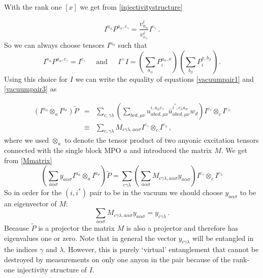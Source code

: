 \documentclass[12 pt]{article}
\begin{document}
With the rank one $[x]$ we get from \eqref{injectivitystructure}

\begin{equation}
I^{a_\alpha}P^{a_\alpha,c_\gamma} = \frac{v^i_{a_\alpha}}{v^i_{c_\gamma}}I^{c_\gamma}\, .
\end{equation}
So we can always choose tensors $I^{a_\alpha}$ such that
\begin{equation}
I^{a_\alpha}P^{a_\alpha,c_\gamma} =I^{c_\gamma}\;\;\;\;\text{ and }\;\;\;\; I^+I=\left(\sum_{a_\alpha}P_i^{a_\alpha,x}\right)\left( \sum_{b_\beta} P^{x,b_\beta}_i \right)\, .
\end{equation}
Using this choice for $I$ we can write the equality of equations \eqref{vacuumpair1} and \eqref{vacuumpair3} as

\begin{eqnarray}
\left(I^{a_\alpha}\otimes_a I^{a_\sigma} \right)\tilde{P} & =& \sum_{c,\gamma\lambda} \left( \sum_{bcd,\mu\nu} u^{i,a_\alpha c_\gamma}_{abcd,\mu\nu} \bar{u}^{i^*,c_\lambda a_\sigma}_{abcd,\mu\nu}  w_d\right) I^{c_\gamma} \otimes_c I^{c_\lambda}  \\
 & \equiv & \sum_{c,\gamma\lambda} M_{c\gamma\lambda,a\alpha\sigma} I^{c_\gamma} \otimes_c I^{c_\lambda} \, , \label{Mmatrix}
\end{eqnarray}
where we used $\otimes_a$ to denote the tensor product of two anyonic excitation tensors connected with the single block MPO $a$ and introduced the matrix $M$. We get from \eqref{Mmatrix}
\begin{equation}
\left(\sum_{a\alpha\sigma} y_{a\alpha\sigma} I^{a_\alpha}\otimes_a I^{a_\sigma} \right)\tilde{P} = \sum_{c\gamma\lambda}\left(\sum_{a\alpha\sigma} M_{c\gamma\lambda, a\alpha\sigma}y_{a\alpha\sigma}\right) I^{c_\gamma} \otimes_c I^{c_\lambda}
\end{equation}
So in order for the $(i,i^*)$ pair to be in the vacuum we should choose $y_{a\alpha\sigma}$ to be an eigenvector of $M$:
\begin{equation}
\sum_{a\alpha\sigma} M_{c\gamma\lambda, a\alpha\sigma}y_{a\alpha\sigma}  = y_{c\gamma\lambda}\, .
\end{equation}
Because $\tilde{P}$ is a projector the matrix $M$ is also a projector and therefore has eigenvalues one or zero. Note that in general the vector $y_{c\gamma\lambda}$ will be entangled in the indices $\gamma$ and $\lambda$. However, this is purely `virtual' entanglement that cannot be destroyed by measurements on only one anyon in the pair because of the rank-one injectivity structure of $I$. 
\end{document}

